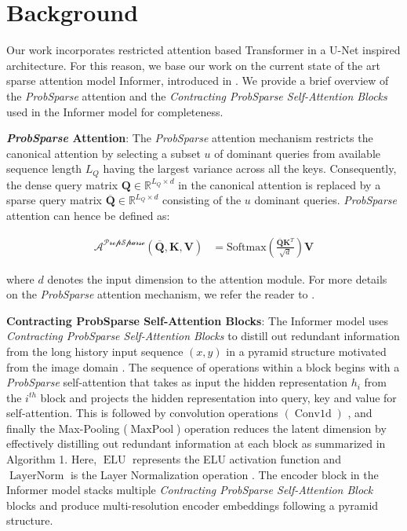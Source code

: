 \section{Background}

Our work incorporates restricted attention based Transformer in a U-Net inspired architecture. For this reason, we base our work on the current state of the art sparse attention model Informer, introduced in \cite{zhou2020informer}. We provide a brief overview of the \textsl{ProbSparse} attention and the \textsl{Contracting ProbSparse Self-Attention Blocks} used in the Informer model for completeness.

\textbf{\textsl{ProbSparse} Attention}: The \textsl{ProbSparse} attention mechanism restricts the canonical attention \cite{vaswani2017attention} by selecting a subset $u$ of dominant queries from available sequence length $L_Q$ having the largest variance  across all the keys. Consequently, the dense query matrix ${\boldsymbol{Q}} \in \mathbb{R}^{L_Q \times d}$ in the canonical attention is replaced by a sparse query matrix $\overline{\boldsymbol{Q}} \in \mathbb{R}^{L_Q \times d}$ consisting of the $u$ dominant queries. \textsl{ProbSparse} attention can hence be defined as: 

\begin{equation}
\begin{aligned}
  \mathcal{A^{\text{PropSparse}}}(\boldsymbol{\overline{Q}}, \boldsymbol{K}, \boldsymbol{V}) &= \text{Softmax}(\frac{\boldsymbol{\overline{Q}}\boldsymbol{K}^T}{\sqrt{d}})\boldsymbol{V}
\end{aligned}
\label{eqn:probsparseattn}
\end{equation}

where $d$ denotes the input dimension to the attention module. For more details on the \textsl{ProbSparse} attention mechanism, we refer the reader to \cite{zhou2020informer}.

\textbf{Contracting ProbSparse Self-Attention Blocks}: The Informer model uses \textsl{Contracting ProbSparse Self-Attention Blocks} to distill out redundant information from the long history input sequence $(x,y)$ in a pyramid structure motivated from the image domain \cite{lin2017feature}. The sequence of operations within a block begins with a \textsl{ProbSparse} self-attention that takes as input the hidden representation $h_i$ from the $i^{th}$ block and projects the hidden representation into query, key and value for self-attention. This is followed by convolution operations $(\operatorname{Conv1d})$ \cite{alexnet}, and finally the Max-Pooling ($\operatorname{MaxPool}$) \cite{alexnet} operation reduces the latent dimension by effectively distilling out redundant information at each block as summarized in Algorithm 1. Here, $\operatorname{ELU}$ represents the ELU activation function \cite{elu} and $\operatorname{LayerNorm}$ is the Layer Normalization operation \cite{layernorm}.
The encoder block in the Informer model \cite{zhou2020informer} stacks multiple \textsl{Contracting ProbSparse Self-Attention Block} blocks and produce multi-resolution encoder embeddings following a pyramid structure. 


